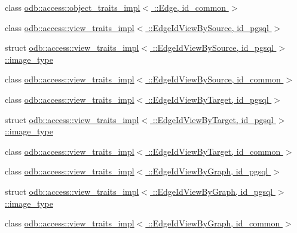 \begin{DoxyCompactItemize}
class \hyperlink{classodb_1_1access_1_1object__traits__impl_3_01_1_1_edge_00_01id__common_01_4}{odb\+::access\+::object\+\_\+traits\+\_\+impl$<$ \+::\+Edge, id\+\_\+common $>$}
\item 
class \hyperlink{classodb_1_1access_1_1view__traits__impl_3_01_1_1_edge_id_view_by_source_00_01id__pgsql_01_4}{odb\+::access\+::view\+\_\+traits\+\_\+impl$<$ \+::\+Edge\+Id\+View\+By\+Source, id\+\_\+pgsql $>$}
\item 
struct \hyperlink{structodb_1_1access_1_1view__traits__impl_3_01_1_1_edge_id_view_by_source_00_01id__pgsql_01_4_1_1image__type}{odb\+::access\+::view\+\_\+traits\+\_\+impl$<$ \+::\+Edge\+Id\+View\+By\+Source, id\+\_\+pgsql $>$\+::image\+\_\+type}
\item 
class \hyperlink{classodb_1_1access_1_1view__traits__impl_3_01_1_1_edge_id_view_by_source_00_01id__common_01_4}{odb\+::access\+::view\+\_\+traits\+\_\+impl$<$ \+::\+Edge\+Id\+View\+By\+Source, id\+\_\+common $>$}
\item 
class \hyperlink{classodb_1_1access_1_1view__traits__impl_3_01_1_1_edge_id_view_by_target_00_01id__pgsql_01_4}{odb\+::access\+::view\+\_\+traits\+\_\+impl$<$ \+::\+Edge\+Id\+View\+By\+Target, id\+\_\+pgsql $>$}
\item 
struct \hyperlink{structodb_1_1access_1_1view__traits__impl_3_01_1_1_edge_id_view_by_target_00_01id__pgsql_01_4_1_1image__type}{odb\+::access\+::view\+\_\+traits\+\_\+impl$<$ \+::\+Edge\+Id\+View\+By\+Target, id\+\_\+pgsql $>$\+::image\+\_\+type}
\item 
class \hyperlink{classodb_1_1access_1_1view__traits__impl_3_01_1_1_edge_id_view_by_target_00_01id__common_01_4}{odb\+::access\+::view\+\_\+traits\+\_\+impl$<$ \+::\+Edge\+Id\+View\+By\+Target, id\+\_\+common $>$}
\item 
class \hyperlink{classodb_1_1access_1_1view__traits__impl_3_01_1_1_edge_id_view_by_graph_00_01id__pgsql_01_4}{odb\+::access\+::view\+\_\+traits\+\_\+impl$<$ \+::\+Edge\+Id\+View\+By\+Graph, id\+\_\+pgsql $>$}
\item 
struct \hyperlink{structodb_1_1access_1_1view__traits__impl_3_01_1_1_edge_id_view_by_graph_00_01id__pgsql_01_4_1_1image__type}{odb\+::access\+::view\+\_\+traits\+\_\+impl$<$ \+::\+Edge\+Id\+View\+By\+Graph, id\+\_\+pgsql $>$\+::image\+\_\+type}
\item 
class \hyperlink{classodb_1_1access_1_1view__traits__impl_3_01_1_1_edge_id_view_by_graph_00_01id__common_01_4}{odb\+::access\+::view\+\_\+traits\+\_\+impl$<$ \+::\+Edge\+Id\+View\+By\+Graph, id\+\_\+common $>$}

\end{DoxyCompactItemize}
